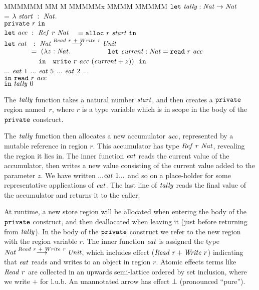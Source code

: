 \begin{tabbing}
MMMMMM \= MM \= M \= MMMMMx \= MMMM \= MMMMM \kill
\> $\texttt{let}~ \mathit{tally} : \mathit{Nat} \to \mathit{Nat}$                                                         \\
\> \> = \> $\lambda~ \mathit{start} ~:~ \mathit{Nat}.$                                                       \\
\> \> \> $\texttt{private}~ r~ \texttt{in}~$                                                                  \\
\> \>   \> $\texttt{let}~   \mathit{acc} ~:~ \mathit{Ref}~ r~ \mathit{Nat}$     
                        \>      \> ~ $= \texttt{alloc}~ r~ \mathit{start}~ \texttt{in}$                              \\
\> \>   \> $\texttt{let}~   \mathit{eat} ~~:~ \mathit{Nat} \stackrel{Read~ r ~+~ Write~ r}{\longrightarrow} \mathit{Unit}$   \\
\> \>   \> ~~~~~~~ $=~ (\lambda z : \mathit{Nat}.$ 
            \> ~~~~~~~~~ $\texttt{let}~  \mathit{current} : \mathit{Nat} = \texttt{read}~ r~ \mathit{acc}$                        \\
\> \>   \>  \> ~~~~~~~~~ $\texttt{in}~~~ \texttt{write}~ r~ \mathit{acc}~ (\mathit{current} + z)) ~~\texttt{in}$                   \\
\> \>   \> ... $\mathit{eat}~ 1$ ... $\mathit{eat}~ 5$ ... $\mathit{eat}~ 2$ ...                                     \\      
\> \>   \> $\texttt{in}~ \texttt{read}~ r~ \mathit{acc}$                                                             \\
\> $\texttt{in}~ \mathit{tally}~ 0$
\end{tabbing}

The $\mathit{tally}$ function takes a natural number $\mathit{start}$, and then creates a $\texttt{private}$ region named~$r$, where $r$ is a type variable which is in scope in the body of the $\texttt{private}$ construct.

The $\mathit{tally}$ function then allocates a new accumulator $\mathit{acc}$, represented by a mutable reference in region $r$. This accumulator has type $\mathit{Ref}~ r~ \mathit{Nat}$, revealing the region it lies in. The inner function $\mathit{eat}$ reads the current value of the accumulator, then writes a new value consisting of the current value added to the parameter $z$.  We have written $... \mathit{eat}~ 1 ... $ and so on a place-holder for some representative applications of $\mathit{eat}$. The last line of $\mathit{tally}$ reads the final value of the accumulator and returns it to the caller.

At runtime, a new store region will be allocated when entering the body of the $\texttt{private}$ construct, and then deallocated when leaving it (just before returning from $\mathit{tally}$). In the body of the $\texttt{private}$ construct we refer to the new region with the region variable $r$. The inner function $\mathit{eat}$ is assigned the type $\mathit{Nat} \stackrel{Read~ r ~+~ Write~ r}{\longrightarrow} \mathit{Unit}$, which includes effect ($\mathit{Read}~ r + \mathit{Write}~ r$) indicating that $\mathit{eat}$ reads and writes to an object in region $r$. Atomic effects terms like $\mathit{Read}~r$ are collected in an upwards semi-lattice ordered by set inclusion, where we write $+$ for l.u.b. An unannotated arrow has effect $\bot$ (pronounced ``pure'').

